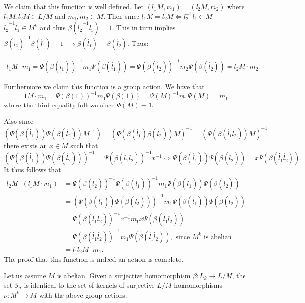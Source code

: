 We claim that this function is well defined. 
Let $(l_1M, m_1) = (l_2M, m_2)$ where $l_1M, l_2M \in L/M$ and $m_1, m_2 \in M$. Then since $l_1M = l_2M \iff l_2^{-1}l_1 \in M$, $\dot{l_2}^{-1}\dot{l_1} \in M^k$ and thus $\beta(\dot{l_2}^{-1}\dot{l_1}) = 1$. 
This in turn implies $ \beta(\dot{l_2})^{-1}\beta(\dot{l_1}) = 1 \implies \beta(\dot{l_1}) = \beta(\dot{l_2})$. 
Thus: 

\begin{align*}
    l_1M \cdot m_1 = \Psi(\beta(\dot{l_1}))^{-1}m_1\Psi(\beta(\dot{l_1})) = \Psi(\beta(\dot{l_2}))^{-1}m_2\Psi(\beta(\dot{l_2})) = l_2M \cdot m_2.
\end{align*}

Furthermore we claim this function is a group action. We have that 
$$
1M \cdot m_1 = \Psi(\beta(1))^{-1}m_1\Psi(\beta(1)) = \Psi(M)^{-1}m_1\Psi(M) = m_1 
$$
where the third equality follows since $\Psi(M) = 1$.

Also since $(\Psi(\beta(\dot{l_1}))\Psi(\beta(\dot{l_2}))M^{-1}) = (\Psi(\beta(\dot{l_1})\beta(\dot{l_2}))M)^{-1} = (\Psi(\beta(\dot{l_1}\dot{l_2}))M)^{-1}$ there exists an $x \in M$ such that 
$$
(\Psi(\beta(\dot{l_1}))\Psi(\beta(\dot{l_2})))^{-1} = \Psi(\beta(\dot{l_1}\dot{l_2}))^{-1}x^{-1} \iff \Psi(\beta(\dot{l_1}))\Psi(\beta(\dot{l_2})) = x\Psi(\beta(\dot{l_1}\dot{l_2})).
$$
It thus follows that
\begin{align*}
    l_2M \cdot (l_1M \cdot m_1) &= \Psi(\beta(\dot{l_2}))^{-1}\Psi(\beta(\dot{l_1}))^{-1}m_1\Psi(\beta(\dot{l_1}))\Psi(\beta(\dot{l_2})) \\
    &= (\Psi(\beta(\dot{l_1}))\Psi(\beta(\dot{l_2})))^{-1}m_1\Psi(\beta(\dot{l_1}))\Psi(\beta(\dot{l_2})) \\
    &= \Psi(\beta(\dot{l_1}\dot{l_2}))^{-1}x^{-1}m_1x\Psi(\beta(\dot{l_1}\dot{l_2})) \\
    &= \Psi(\beta(\dot{l_1}\dot{l_2}))^{-1}m_1\Psi(\beta(\dot{l_1}\dot{l_2})), \text{ since $M^k$ is abelian} \\
    &= l_1l_2M \cdot m_1.
\end{align*}
The proof that this function is indeed an action is complete.


\begin{theorem}
    \label{S4:LMhom}
    Let us assume $M$ is abelian. Given a surjective homomorphism $\beta \colon L_k \rightarrow L/M$, the set $\mathscr{S}_\beta$ is identical to the set of kernels of surjective $L/M$-homomorphisms $\nu \colon M^k \rightarrow M$ with the above group actions.
\end{theorem}

